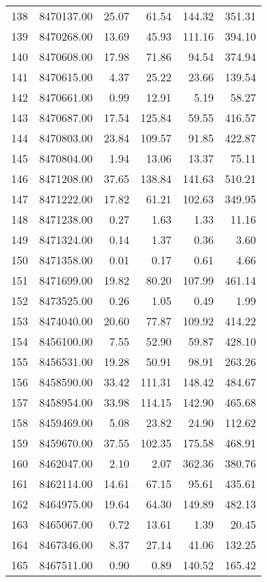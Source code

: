 \begin{table}[ht]
\begin{tabular}{rrrrrr}
  138 & 8470137.00 & 25.07 & 61.54 & 144.32 & 351.31 \\ 
  139 & 8470268.00 & 13.69 & 45.93 & 111.16 & 394.10 \\ 
  140 & 8470608.00 & 17.98 & 71.86 & 94.54 & 374.94 \\ 
  141 & 8470615.00 & 4.37 & 25.22 & 23.66 & 139.54 \\ 
  142 & 8470661.00 & 0.99 & 12.91 & 5.19 & 58.27 \\ 
  143 & 8470687.00 & 17.54 & 125.84 & 59.55 & 416.57 \\ 
  144 & 8470803.00 & 23.84 & 109.57 & 91.85 & 422.87 \\ 
  145 & 8470804.00 & 1.94 & 13.06 & 13.37 & 75.11 \\ 
  146 & 8471208.00 & 37.65 & 138.84 & 141.63 & 510.21 \\ 
  147 & 8471222.00 & 17.82 & 61.21 & 102.63 & 349.95 \\ 
  148 & 8471238.00 & 0.27 & 1.63 & 1.33 & 11.16 \\ 
  149 & 8471324.00 & 0.14 & 1.37 & 0.36 & 3.60 \\ 
  150 & 8471358.00 & 0.01 & 0.17 & 0.61 & 4.66 \\ 
  151 & 8471699.00 & 19.82 & 80.20 & 107.99 & 461.14 \\ 
  152 & 8473525.00 & 0.26 & 1.05 & 0.49 & 1.99 \\ 
  153 & 8474040.00 & 20.60 & 77.87 & 109.92 & 414.22 \\ 
  154 & 8456100.00 & 7.55 & 52.90 & 59.87 & 428.10 \\ 
  155 & 8456531.00 & 19.28 & 50.91 & 98.91 & 263.26 \\ 
  156 & 8458590.00 & 33.42 & 111.31 & 148.42 & 484.67 \\ 
  157 & 8458954.00 & 33.98 & 114.15 & 142.90 & 465.68 \\ 
  158 & 8459469.00 & 5.08 & 23.82 & 24.90 & 112.62 \\ 
  159 & 8459670.00 & 37.55 & 102.35 & 175.58 & 468.91 \\ 
  160 & 8462047.00 & 2.10 & 2.07 & 362.36 & 380.76 \\ 
  161 & 8462114.00 & 14.61 & 67.15 & 95.61 & 435.61 \\ 
  162 & 8464975.00 & 19.64 & 64.30 & 149.89 & 482.13 \\ 
  163 & 8465067.00 & 0.72 & 13.61 & 1.39 & 20.45 \\ 
  164 & 8467346.00 & 8.37 & 27.14 & 41.06 & 132.25 \\ 
  165 & 8467511.00 & 0.90 & 0.89 & 140.52 & 165.42 \\ 

\end{tabular}
\end{table}
